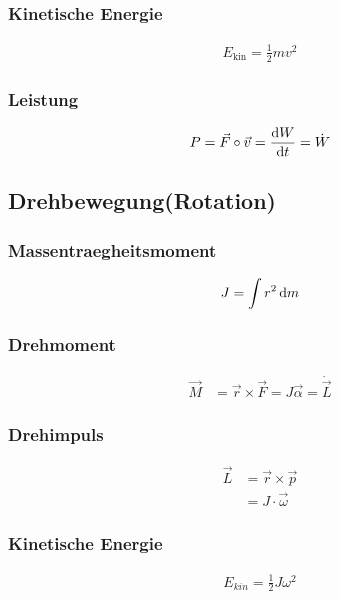 \begin{multicols}{2}{}
\subsubsection{Kinetische Energie}
\begin{align*}
E_{\text{kin}}=\frac{1}{2}mv^2
\end{align*}

\subsubsection{Leistung}
\begin{align*}
P=\vec{F}\circ\vec{v}=\frac{\mathop{}\!\mathrm{d} W}{\mathop{}\!\mathrm{d} t}=\dot{W}
\end{align*}
\end{multicols}


\subsection{Drehbewegung(Rotation)}

\begin{multicols}{2}{}
\subsubsection{Massentraegheitsmoment}
\begin{align*}
J=\int r^2 \mathop{}\!\mathrm{d} m
\end{align*}

\subsubsection{Drehmoment}
\begin{align*}
\vec{M}&=\vec{r}\times\vec{F}=J\vec{\alpha}=\dot{\vec{L}}
\end{align*}
\end{multicols}

\begin{multicols}{2}{}
\subsubsection{Drehimpuls}
\begin{align*}
\vec{L}&=\vec{r}\times\vec{p} \\
&=J\cdot \vec{\omega}
\end{align*}

\subsubsection{Kinetische Energie}
\begin{align*}
E_{kin}=\frac{1}{2}J\omega^2 \\
\end{align*}
\end{multicols}


